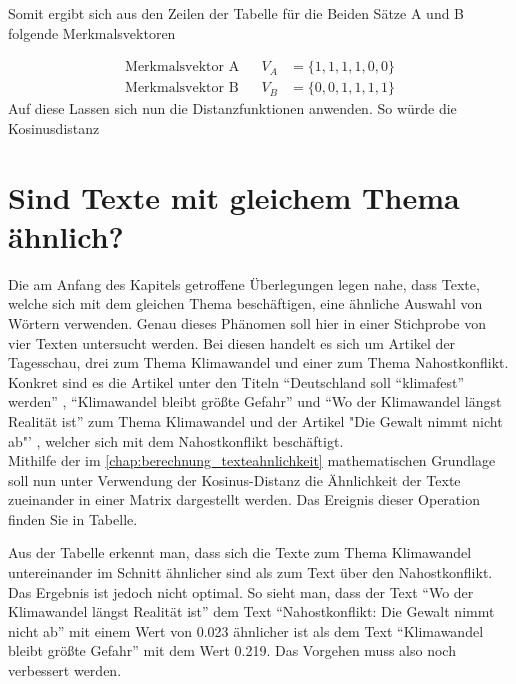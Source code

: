 Somit ergibt sich aus den Zeilen der Tabelle für die Beiden Sätze A und B folgende Merkmalsvektoren

\begin{equation}
	\begin{aligned} 
		\text{Merkmalsvektor A}&& V_{A}&=\{1,1,1,1,0,0\}  \\
		\text{Merkmalsvektor B}&& V_{B}&=\{0,0,1,1,1,1\}
	\end{aligned} 
\label{eq:merkmalsvektoren}
\end{equation}
Auf diese Lassen sich nun die Distanzfunktionen anwenden. So würde die Kosinusdistanz 

\section{Sind Texte mit gleichem Thema ähnlich?}
Die am Anfang des Kapitels getroffene Überlegungen legen nahe, dass Texte, welche sich mit dem gleichen Thema beschäftigen, eine ähnliche Auswahl von Wörtern verwenden. Genau dieses Phänomen soll hier in einer Stichprobe von vier Texten untersucht werden. Bei diesen handelt es sich um Artikel der Tagesschau, drei zum Thema Klimawandel und einer zum Thema Nahostkonflikt. Konkret sind es die Artikel unter den Titeln "`Deutschland soll "`klimafest"' werden"' , "`Klimawandel bleibt größte Gefahr"'  und "`Wo der Klimawandel längst Realität ist"'  zum Thema Klimawandel und der Artikel "Die Gewalt nimmt nicht ab"' , welcher sich mit dem Nahostkonflikt beschäftigt. \\ \newline
Mithilfe der im \autoref{chap:berechnung_texteahnlichkeit} mathematischen Grundlage soll nun unter Verwendung der Kosinus-Distanz die Ähnlichkeit der Texte zueinander in einer Matrix dargestellt werden. Das Ereignis dieser Operation finden Sie in Tabelle.  

Aus der Tabelle erkennt man, dass sich die Texte zum Thema Klimawandel untereinander im Schnitt ähnlicher sind als zum Text über den Nahostkonflikt. Das Ergebnis ist jedoch nicht optimal. So sieht man, dass der Text  "`Wo der Klimawandel längst Realität ist"' dem Text "`Nahostkonflikt: Die Gewalt nimmt nicht ab"' mit einem Wert von 0.023 ähnlicher ist als dem Text "`Klimawandel bleibt größte Gefahr"' mit dem Wert 0.219. Das Vorgehen muss also noch verbessert werden.

